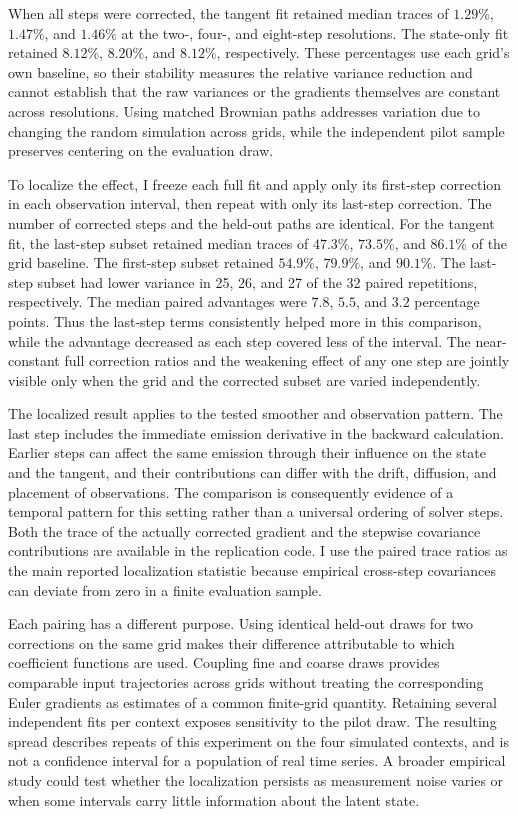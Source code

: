 \documentclass[12pt]{article}
\begin{document}
When all steps were corrected, the tangent fit retained median traces of \(1.29\%\), \(1.47\%\), and \(1.46\%\) at the two-, four-, and eight-step resolutions. The state-only fit retained \(8.12\%\), \(8.20\%\), and \(8.12\%\), respectively. These percentages use each grid's own baseline, so their stability measures the relative variance reduction and cannot establish that the raw variances or the gradients themselves are constant across resolutions. Using matched Brownian paths addresses variation due to changing the random simulation across grids, while the independent pilot sample preserves centering on the evaluation draw.

To localize the effect, I freeze each full fit and apply only its first-step correction in each observation interval, then repeat with only its last-step correction. The number of corrected steps and the held-out paths are identical. For the tangent fit, the last-step subset retained median traces of \(47.3\%\), \(73.5\%\), and \(86.1\%\) of the grid baseline. The first-step subset retained \(54.9\%\), \(79.9\%\), and \(90.1\%\). The last-step subset had lower variance in 25, 26, and 27 of the 32 paired repetitions, respectively. The median paired advantages were \(7.8\), \(5.5\), and \(3.2\) percentage points. Thus the last-step terms consistently helped more in this comparison, while the advantage decreased as each step covered less of the interval. The near-constant full correction ratios and the weakening effect of any one step are jointly visible only when the grid and the corrected subset are varied independently.

The localized result applies to the tested smoother and observation pattern. The last step includes the immediate emission derivative in the backward calculation. Earlier steps can affect the same emission through their influence on the state and the tangent, and their contributions can differ with the drift, diffusion, and placement of observations. The comparison is consequently evidence of a temporal pattern for this setting rather than a universal ordering of solver steps. Both the trace of the actually corrected gradient and the stepwise covariance contributions are available in the replication code. I use the paired trace ratios as the main reported localization statistic because empirical cross-step covariances can deviate from zero in a finite evaluation sample.

Each pairing has a different purpose. Using identical held-out draws for two corrections on the same grid makes their difference attributable to which coefficient functions are used. Coupling fine and coarse draws provides comparable input trajectories across grids without treating the corresponding Euler gradients as estimates of a common finite-grid quantity. Retaining several independent fits per context exposes sensitivity to the pilot draw. The resulting spread describes repeats of this experiment on the four simulated contexts, and is not a confidence interval for a population of real time series. A broader empirical study could test whether the localization persists as measurement noise varies or when some intervals carry little information about the latent state.
\end{document}
